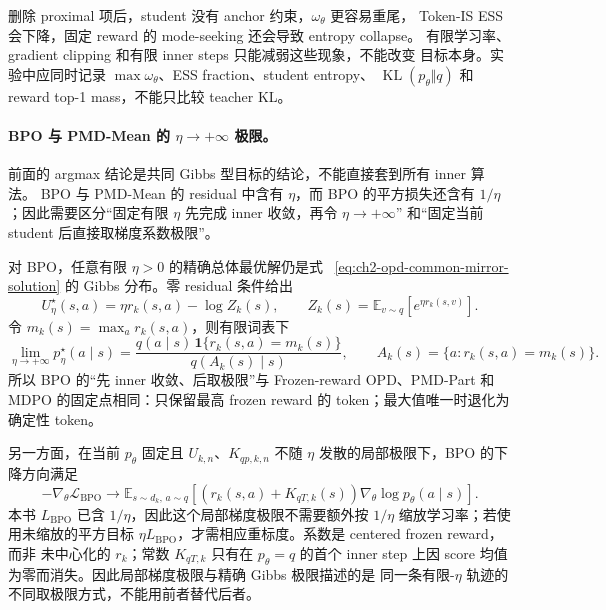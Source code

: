 \documentclass[lang=cn,scheme=chinese,openany]{../book/elegantbook}
\begin{document}
删除 proximal 项后，student 没有 anchor 约束，$\omega_\theta$ 更容易重尾， Token-IS ESS 会下降，固定 reward 的 mode-seeking 还会导致 entropy collapse。 有限学习率、gradient clipping 和有限 inner steps 只能减弱这些现象，不能改变 目标本身。实验中应同时记录 $\max\omega_\theta$、ESS fraction、student entropy、 $\operatorname{KL}(p_\theta\Vert q)$ 和 reward top-1 mass，不能只比较 teacher KL。

\paragraph{BPO 与 PMD-Mean 的 $\eta\to+\infty$ 极限。} 前面的 argmax 结论是共同 Gibbs 型目标的结论，不能直接套到所有 inner 算法。 BPO 与 PMD-Mean 的 residual 中含有 $\eta$，而 BPO 的平方损失还含有 $1/\eta$；因此需要区分“固定有限 $\eta$ 先完成 inner 收敛，再令 $\eta\to+\infty$” 和“固定当前 student 后直接取梯度系数极限”。

对 BPO，任意有限 $\eta>0$ 的精确总体最优解仍是式 ~\eqref{eq:ch2-opd-common-mirror-solution} 的 Gibbs 分布。零 residual 条件给出
\begin{equation}
U^\star_\eta(s,a)=\eta r_k(s,a)-\log Z_k(s),
\qquad
Z_k(s)=\mathbb E_{v\sim q}\left[e^{\eta r_k(s,v)}\right].
\end{equation}
令 $m_k(s)=\max_a r_k(s,a)$，则有限词表下
\begin{equation}
\lim_{\eta\to+\infty}p^\star_{\eta}(a\mid s)
=\frac{q(a\mid s)\,\mathbf 1\{r_k(s,a)=m_k(s)\}}
{q(A_k(s)\mid s)},
\qquad A_k(s)=\{a:r_k(s,a)=m_k(s)\}.
\label{eq:ch2-opd-bpo-infinity-target}
\end{equation}
所以 BPO 的“先 inner 收敛、后取极限”与 Frozen-reward OPD、PMD-Part 和 MDPO 的固定点相同：只保留最高 frozen reward 的 token；最大值唯一时退化为 确定性 token。

另一方面，在当前 $p_\theta$ 固定且 $U_{k,n}$、$K_{qp,k,n}$ 不随 $\eta$ 发散的局部极限下，BPO 的下降方向满足
\begin{equation}
-\nabla_\theta\mathcal L_{\mathrm{BPO}}
\longrightarrow
\mathbb E_{s\sim d_k,\,a\sim q}
\left[(r_k(s,a)+K_{qT,k}(s))
\nabla_\theta\log p_\theta(a\mid s)\right].
\label{eq:ch2-opd-bpo-infinity-gradient}
\end{equation}
本书 $L_{\mathrm{BPO}}$ 已含 $1/\eta$，因此这个局部梯度极限不需要额外按 $1/\eta$ 缩放学习率；若使用未缩放的平方目标 $\eta L_{\mathrm{BPO}}$，才需相应重标度。系数是 centered frozen reward，而非 未中心化的 $r_k$；常数 $K_{qT,k}$ 只有在 $p_\theta=q$ 的首个 inner step 上因 score 均值为零而消失。因此局部梯度极限与精确 Gibbs 极限描述的是 同一条有限-$\eta$ 轨迹的不同取极限方式，不能用前者替代后者。
\end{document}
